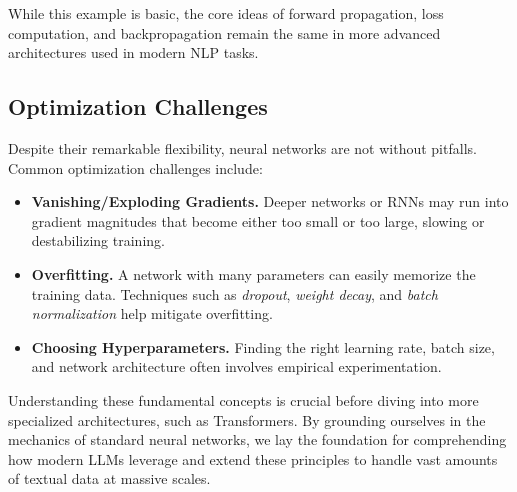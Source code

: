 \noindent
While this example is basic, the core ideas of forward propagation, loss computation, and backpropagation remain the same in more advanced architectures used in modern NLP tasks.

\subsection{Optimization Challenges}
\noindent
Despite their remarkable flexibility, neural networks are not without pitfalls. Common optimization challenges include:
\begin{itemize}
    \item \textbf{Vanishing/Exploding Gradients.} Deeper networks or RNNs may run into gradient magnitudes that become either too small or too large, slowing or destabilizing training.
    \item \textbf{Overfitting.} A network with many parameters can easily memorize the training data. Techniques such as \emph{dropout}, \emph{weight decay}, and \emph{batch normalization} help mitigate overfitting.
    \item \textbf{Choosing Hyperparameters.} Finding the right learning rate, batch size, and network architecture often involves empirical experimentation.
\end{itemize}

\noindent
Understanding these fundamental concepts is crucial before diving into more specialized architectures, such as Transformers. By grounding ourselves in the mechanics of standard neural networks, we lay the foundation for comprehending how modern LLMs leverage and extend these principles to handle vast amounts of textual data at massive scales.


